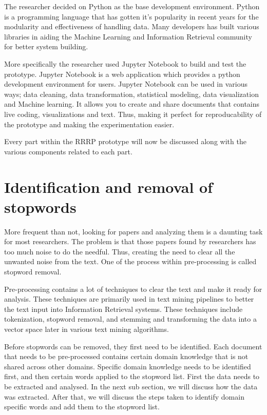 The researcher decided on Python as the base development environment. Python is a programming language that has gotten it's popularity in recent years for the modularity and effectiveness of handling data. Many developers has built various libraries in aiding the Machine Learning and Information Retrieval community for better system building.

More specifically the researcher used Jupyter Notebook to build and test the prototype. Jupyter Notebook is a web application which provides a python development environment for users. Jupyter Notebook can be used in various ways; data cleaning, data transformation, statistical modeling, data visualization and Machine learning. It allows you to create and share documents that contains live coding, visualizations and text. Thus, making it perfect for reproducability of the prototype and making the experimentation easier.

Every part within the RRRP prototype will now be discussed along with the various components related to each part.

\section{Identification and removal of stopwords} \label{ssec:pre}

More frequent than not, looking for papers and analyzing them is a daunting task for most researchers. The problem is that those papers found by researchers has too much noise to do the needful. Thus, creating the need to clear all the unwanted noise from the text. One of the process within pre-processing is called stopword removal. 

Pre-processing contains a lot of techniques to clear the text and make it ready for analysis. These techniques are primarily used in text mining pipelines to better the text input into Information Retrieval systems. These techniques include tokenization, stopword removal, and stemming and transforming the data into a vector space later in various text mining algorithms. 

Before stopwords can be removed, they first need to be identified. Each document that needs to be pre-processed contains certain domain knowledge that is not shared across other domains. Specific domain knowledge needs to be identified first, and then certain words applied to the stopword list. First the data needs to be extracted and analysed. In the next sub section, we will discuss how the data was extracted. After that, we will discuss the steps taken to identify domain specific words and add them to the stopword list.

